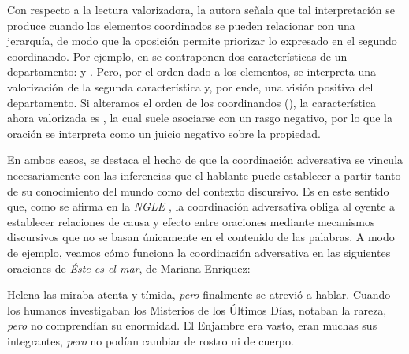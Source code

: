 Con respecto a la lectura valorizadora, la autora señala que tal interpretación
se produce cuando los elementos coordinados se pueden relacionar con una
jerarquía, de modo que la oposición permite priorizar lo expresado en el segundo
coordinando. Por ejemplo, en  se contraponen dos
características de un departamento:  y .
Pero, por el orden dado a los elementos, se interpreta una valorización de la
segunda característica y, por ende, una visión positiva del departamento. Si
alteramos el orden de los coordinandos (), la característica ahora valorizada es , la cual suele
asociarse con un rasgo negativo, por lo que la oración se interpreta como un
juicio negativo sobre la propiedad.

En ambos casos, se destaca el hecho de que la coordinación adversativa se vincula
necesariamente con las inferencias que el hablante puede establecer a partir
tanto de su conocimiento del mundo como del contexto discursivo. Es en este
sentido que, como se afirma en la \textit{NGLE} \parencite[§\,31.10i]{rae2025},
la coordinación adversativa obliga al oyente a establecer relaciones de causa y
efecto entre oraciones mediante mecanismos discursivos que no se basan
únicamente en el contenido de las palabras. A modo de ejemplo, veamos cómo
funciona la coordinación adversativa en las siguientes oraciones de \textit{Éste
es el mar}, de Mariana Enriquez:

\begin{exe}
  \ex
    \begin{xlist}
      \ex\label{ex:12-helena} Helena las miraba atenta y tímida, \textit{pero}
          finalmente se atrevió a hablar.
      \ex\label{ex:12-humanos} Cuando los humanos investigaban los Misterios de
          los Últimos Días, notaban la rareza, \textit{pero} no comprendían su
          enormidad.
      \ex\label{ex:12-enjambre} El Enjambre era vasto, eran muchas sus
          integrantes, \textit{pero} no podían cambiar de rostro ni de cuerpo.
    \end{xlist}
\end{exe}


